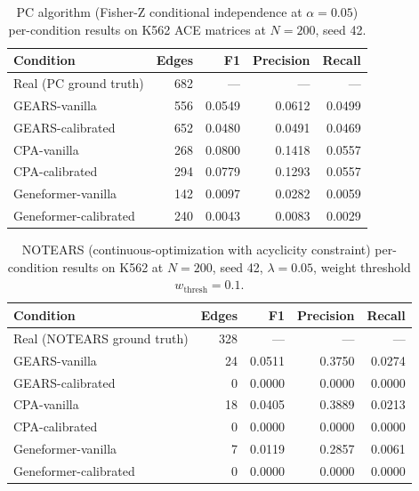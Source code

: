 \documentclass{article}
\theoremstyle{plain}
\theoremstyle{definition}
\theoremstyle{remark}
\begin{document}
\begin{table}[h]
\centering
\small
\begin{tabular}{lrrrr}
\toprule
\textbf{Condition} & \textbf{Edges} & \textbf{F1} & \textbf{Precision} & \textbf{Recall} \\
\midrule
Real (PC ground truth)   & 682 & --- & --- & --- \\
GEARS-vanilla            & 556 & 0.0549 & 0.0612 & 0.0499 \\
GEARS-calibrated         & 652 & 0.0480 & 0.0491 & 0.0469 \\
CPA-vanilla              & 268 & 0.0800 & 0.1418 & 0.0557 \\
CPA-calibrated           & 294 & 0.0779 & 0.1293 & 0.0557 \\
Geneformer-vanilla       & 142 & 0.0097 & 0.0282 & 0.0059 \\
Geneformer-calibrated    & 240 & 0.0043 & 0.0083 & 0.0029 \\
\bottomrule
\end{tabular}
\caption{PC algorithm (Fisher-Z conditional independence at $\alpha{=}0.05$) per-condition results on K562 ACE matrices at $N{=}200$, seed 42.}
\label{tab:pc_full}
\end{table}

\begin{table}[h]
\centering
\small
\begin{tabular}{lrrrr}
\toprule
\textbf{Condition} & \textbf{Edges} & \textbf{F1} & \textbf{Precision} & \textbf{Recall} \\
\midrule
Real (NOTEARS ground truth) & 328 & --- & --- & --- \\
GEARS-vanilla            & 24  & 0.0511 & 0.3750 & 0.0274 \\
GEARS-calibrated         & 0   & 0.0000 & 0.0000 & 0.0000 \\
CPA-vanilla              & 18  & 0.0405 & 0.3889 & 0.0213 \\
CPA-calibrated           & 0   & 0.0000 & 0.0000 & 0.0000 \\
Geneformer-vanilla       & 7   & 0.0119 & 0.2857 & 0.0061 \\
Geneformer-calibrated    & 0   & 0.0000 & 0.0000 & 0.0000 \\
\bottomrule
\end{tabular}
\caption{NOTEARS (continuous-optimization with acyclicity constraint) per-condition results on K562 at $N{=}200$, seed 42, $\lambda{=}0.05$, weight threshold $w_{\mathrm{thresh}}{=}0.1$.}
\label{tab:notears_full}
\end{table}
\end{document}
